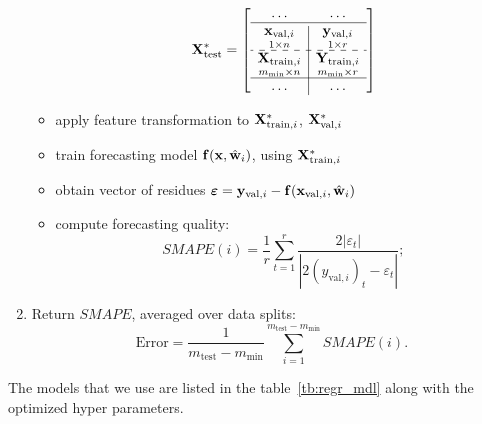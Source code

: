 \documentclass[conference]{IEEEtran}
\begin{document}
\begin{enumerate}[1)]
\begin{itemize}
 \[\bX^{*}_{\text{test}} = \left[\begin{array}{c|c}
 \dots & \dots \\
 \hline
 \underset{1{\times}n}{\bx_{\text{val}, i}} & \underset{1{\times}r}{\by_{\text{val}, i}}  \\
 \hdashline
 \underset{m_{\min}{\times}n}{\bX_{\text{train}, i}}  & \underset{m_{\min}{\times}r}{\bY_{\text{train}, i}} \\
 \hline
 \dots & \dots \\
 \end{array}\right]
 \]
\item apply feature transformation to ${\mathbf{X}}^{*}_{\text{train}, i}$, ${\mathbf{X}}^{*}_{\text{val}, i}$\;
\item  train forecasting model ${\mathbf{f}}({\mathbf{x}}, \hat{{\mathbf{w}}}_i)$, using ${\mathbf{X}}^{*}_{\text{train}, i}$\;
\item  obtain vector of residues ${\boldsymbol{\varepsilon}}  = {\mathbf{y}}_{\text{val}, i} - {\mathbf{f}}({\mathbf{x}}_{\text{val}, i}, \hat{{\mathbf{w}}}_i)$\;
\item  compute forecasting quality:
  \[ {SMAPE}(i)  = \frac{1}{r} \sum_{t=1}^{r} \frac{2|\varepsilon_{t}|}{|2(y_{\text{val}, i})_t - \varepsilon_{t}|};\]
\end{itemize}
\item
  Return $SMAPE$, averaged over data splits:
  \[ \text{Error}  = \frac{1}{m_{\text{test}} - m_{\min}} \sum_{i=1}^{m_{\text{test}} - m_{\min}} {SMAPE}(i).\]
\end{enumerate}
The models that we use are listed in the table~\ref{tb:regr_mdl} along with the optimized hyper parameters.
\end{document}
